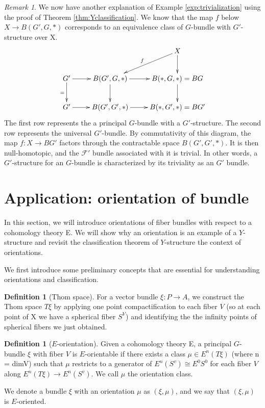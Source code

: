 \documentclass[psamsfonts]{amsart}
\theoremstyle{definition}
\newtheorem{defn}[thm]{Definition}
\theoremstyle{remark}
\newtheorem{rem}[thm]{Remark}
\numberwithin{equation}{section}
\begin{document}
\begin{rem}
We now have another explanation of Example \ref{exp:trivialization} using the proof of Theorem \ref{thm:Yclassification}. We know that the map $f$ below $X \to B(G', G, *)$ corresponds to an equivalence class of $G$-bundle with $G'$-structure over X.
\[\xymatrix{
& & X \ar[d] \ar[dl]_{f}\\
G' \ar[d]_{=} \ar[r] & B(G', G, *) \ar[d] \ar[r] & B(*, G, *) = BG \ar[d]\\
G' \ar[r] & B(G', G', *) \ar[r] & B(*, G', *) = BG' \\} \]
The first row represents the a principal $G$-bundle with a $G'$-structure. The second row represents the universal $G'$-bundle. By commutativity of this diagram, the map $f: X \to BG'$ factors through the contractable space $B(G', G', *)$. It is then null-homotopic, and the $\mathcal{F'}$ bundle associated with it is trivial.
In other words, a $G'$-structure for an $G$-bundle is characterized by its triviality as an $G'$ bundle. 
\end{rem}



\section{Application: orientation of bundle}
In this section, we will introduce orientations of fiber bundles with respect to a cohomology theory E. We will show why an orientation is an example of a $Y$-structure and revisit the classification theorem of $Y$-structure the context of orientations. 

We first introduce some preliminary concepts that are essential for understanding orientations and classification. 
\begin{defn}[Thom space]
For a vector bundle $\xi: P \rightarrow A$, we construct the Thom space $T\xi$ by applying one point compactification to each fiber $V$ (so at each point of X we have a spherical fiber $S^{V}$) and identifying the the infinity points of  spherical fibers we just obtained.
\end{defn}

\begin{defn}[$E$-orientation]
\label{def:Eorientation}
Given a cohomology theory E, a principal $G$-bundle $\xi$ with fiber $V$ is $E$-orientable if there exists a class $\mu \in E^{n}(T\xi)$ (where n = dimV) such that $\mu$ restricts to a generator of $E^{n}(S^{v}) \cong E^{0}S^{0}$ for each fiber $V$ along $E^{n}(T\xi) \rightarrow E^{n}(S^{v})$. We call $\mu$ the orientation class.        

We denote a bundle $\xi$ with an orientation $\mu$ as $(\xi, \mu)$, and we say that $(\xi, \mu)$ is $E$-oriented.
\end{defn}
\end{document}
